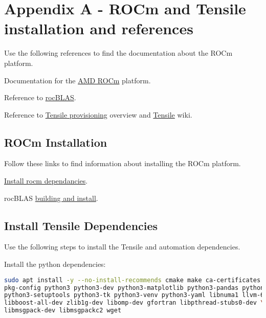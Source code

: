 \documentclass[]{article}
\begin{document}
\section{Appendix A - ROCm and Tensile installation and references}
\label{sec:appendixA}

Use the following references to find the documentation about the ROCm platform.

\noindent Documentation for the \href{https://rocmdocs.amd.com/en/latest/}{AMD ROCm} platform.

\noindent Reference to \href{https://rocblas.readthedocs.io/en/latest/intro.html}{rocBLAS}.

\noindent Reference to \href{https://github.com/ROCmSoftwarePlatform/Tensile/tree/develop/tuning}{Tensile provisioning} overview and \href{https://github.com/ROCmSoftwarePlatform/Tensile/wiki}{Tensile} wiki.

\subsection{ROCm Installation}

Follow these links to find information about installing the ROCm platform. \newline

\noindent \href{https://rocmdocs.amd.com/en/latest/Installation_Guide/Installation-Guide.html}{Install rocm dependancies}.

\noindent rocBLAS \href{https://rocblas.readthedocs.io/en/latest/install.html}{building and install}.

\subsection{Install Tensile Dependencies}

Use the following steps to install the Tensile and automation dependencies. \newline

\noindent Install the python dependencies:

\begin{lstlisting}[language=bash,breaklines=true]
sudo apt install -y --no-install-recommends cmake make ca-certificates git \
pkg-config python3 python3-dev python3-matplotlib python3-pandas python3-pip \
python3-setuptools python3-tk python3-venv python3-yaml libnuma1 llvm-6.0-dev \
libboost-all-dev zlib1g-dev libomp-dev gfortran libpthread-stubs0-dev \ 
libmsgpack-dev libmsgpackc2 wget
\end{lstlisting}
\end{document}
